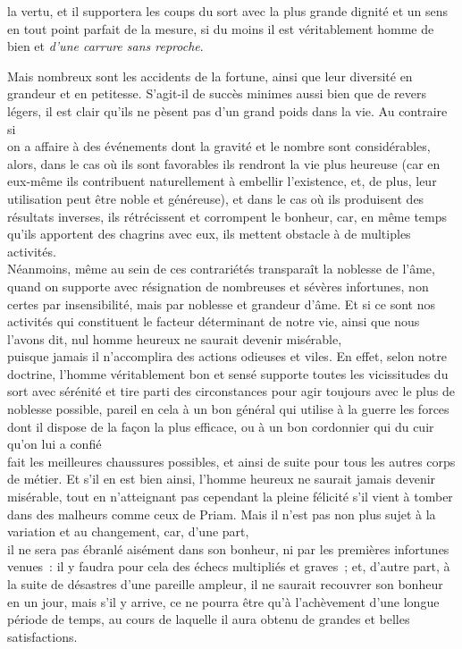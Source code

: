 \documentclass[french,twoside]{book} %
\begin{document}
la vertu, et il supportera les coups du sort avec la plus grande dignité et un sens en tout point parfait de la mesure, si du moins il est véritablement homme de bien et {\itshape d’une carrure sans reproche}.\par
Mais nombreux sont les accidents de la fortune, ainsi que leur diversité en grandeur et en petitesse. S’agit-il de succès minimes aussi bien que de revers légers, il est clair qu’ils ne pèsent pas d’un grand poids dans la vie. Au contraire si \\
on a affaire à des événements dont la gravité et le nombre sont considérables, alors, dans le cas où ils sont favorables ils rendront la vie plus heureuse (car en eux-même ils contribuent naturellement à embellir l’existence, et, de plus, leur utilisation peut être noble et généreuse), et dans le cas où ils produisent des résultats inverses, ils rétrécissent et corrompent le bonheur, car, en même temps qu’ils apportent des chagrins avec eux, ils mettent obstacle à de multiples activités. \\
Néanmoins, même au sein de ces contrariétés transparaît la noblesse de l’âme, quand on supporte avec résignation de nombreuses et sévères infortunes, non certes par insensibilité, mais par noblesse et grandeur d’âme. Et si ce sont nos activités qui constituent le facteur déterminant de notre vie, ainsi que nous l’avons dit, nul homme heureux ne saurait devenir misérable, \\
puisque jamais il n’accomplira des actions odieuses et viles. En effet, selon notre doctrine, l’homme véritablement  bon et sensé supporte toutes les vicissitudes du sort avec sérénité et tire parti des circonstances pour agir toujours avec le plus de noblesse possible, pareil en cela à un bon général qui utilise à la guerre les forces dont il dispose de la façon la plus efficace, ou à un bon cordonnier qui du cuir qu’on lui a confié \\
fait les meilleures chaussures possibles, et ainsi de suite pour tous les autres corps de métier. Et s’il en est bien ainsi, l’homme heureux ne saurait jamais devenir misérable, tout en n’atteignant pas cependant la pleine félicité s’il vient à tomber dans des malheurs comme ceux de Priam. Mais il n’est pas non plus sujet à la variation et au changement, car, d’une part, \\
il ne sera pas ébranlé aisément dans son bonheur, ni par les premières infortunes venues : il y faudra pour cela des échecs multipliés et graves ; et, d’autre part, à la suite de désastres d’une pareille ampleur, il ne saurait recouvrer son bonheur en un jour, mais s’il y arrive, ce ne pourra être qu’à l’achèvement d’une longue période de temps, au cours de laquelle il aura obtenu de grandes et belles satisfactions.\par
\end{document}
